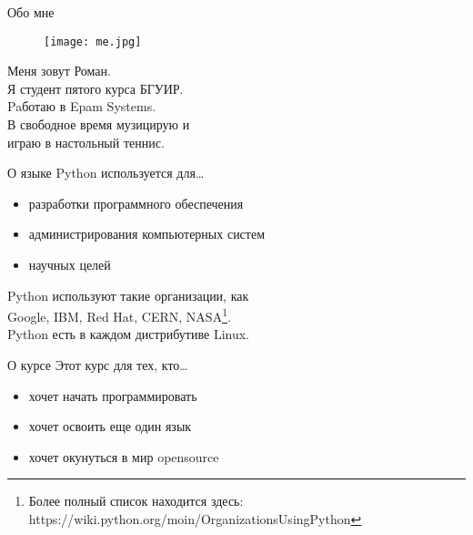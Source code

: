 \documentclass[hyperref={pdftex,unicode}]{beamer}
\begin{document}
\begin{frame}
  \maketitle
\end{frame}

\begin{frame}{Обо мне}
  \begin{minipage}{0.3\linewidth}
    \begin{figure}[H]
      \texttt{[image: me.jpg]}
    \end{figure}
  \end{minipage}
  \hfill
  \begin{minipage}{0.65\linewidth}
    Меня зовут Роман. \\
    Я студент пятого курса БГУИР. \\
    Paботаю в Epam Systems. \\
    В свободное время музицирую и \\
    играю в настольный теннис.
  \end{minipage}
\end{frame}

\begin{frame}{О языке}
  Python используется для\dots
  \begin{itemize}
  \item разработки программного обеспечения
  \item администрирования компьютерных систем
  \item научных целей
  \end{itemize}
  
  Python используют такие организации, как \\
  Google, IBM, Red Hat, CERN, NASA\footnote[frame]{
    Более полный список находится здесь: 
    https://wiki.python.org/moin/OrganizationsUsingPython}. \\
  Python есть в каждом дистрибутиве Linux.
\end{frame}

\begin{frame}{О курсе}
  Этот курс для тех, кто\dots
  \begin{itemize}
    \item хочет начать программировать
    \item хочет освоить еще один язык
    \item хочет окунуться в мир opensource
  \end{itemize}
\end{frame}
\end{document}
